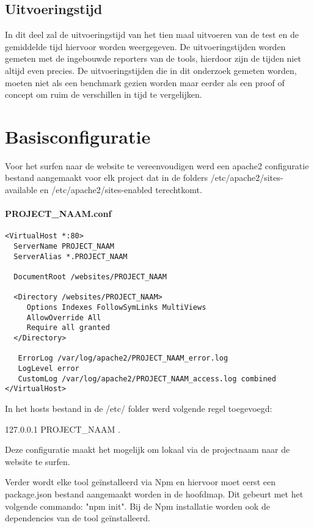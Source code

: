 \subsection{Uitvoeringstijd}
In dit deel zal de uitvoeringstijd van het tien maal uitvoeren van de test en de gemiddelde tijd hiervoor worden weergegeven. De uitvoeringstijden worden gemeten met de ingebouwde reporters van de \glspl{tool}, hierdoor zijn de tijden niet altijd even precies. De uitvoeringstijden die in dit onderzoek gemeten worden, moeten niet als een benchmark gezien worden maar eerder als een proof of concept om ruim de verschillen in tijd te vergelijken.

\clearpage
\section{Basisconfiguratie}
Voor het surfen naar de website te vereenvoudigen werd een apache2 configuratie bestand aangemaakt voor elk project dat in de folders /etc/apache2/sites-available en /etc/apache2/sites-enabled terechtkomt.

\paragraph{PROJECT\_NAAM.conf}
\begin{lstlisting}[breaklines=true]
<VirtualHost *:80>
  ServerName PROJECT_NAAM
  ServerAlias *.PROJECT_NAAM
  
  DocumentRoot /websites/PROJECT_NAAM
  
  <Directory /websites/PROJECT_NAAM>
     Options Indexes FollowSymLinks MultiViews
     AllowOverride All
     Require all granted
  </Directory>
  
   ErrorLog /var/log/apache2/PROJECT_NAAM_error.log
   LogLevel error
   CustomLog /var/log/apache2/PROJECT_NAAM_access.log combined
</VirtualHost>
\end{lstlisting}

In het hosts bestand in de /etc/ folder werd volgende regel toegevoegd: 

127.0.0.1   PROJECT\_NAAM .

Deze configuratie maakt het mogelijk om lokaal via de projectnaam naar de website te surfen.

Verder wordt elke \gls{tool} geïnstalleerd via Npm en hiervoor moet eerst een package.json bestand aangemaakt worden in de hoofdmap. Dit gebeurt met het volgende commando: "npm init". Bij de Npm installatie worden ook de dependencies van de \gls{tool} geïnstalleerd.

